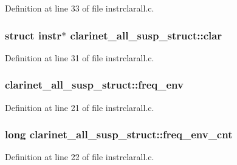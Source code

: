Definition at line 33 of file instrclarall.\+c.

\subsubsection[{\texorpdfstring{clar}{clar}}]{\setlength{\rightskip}{0pt plus 5cm}struct {\bf instr}$\ast$ clarinet\+\_\+all\+\_\+susp\+\_\+struct\+::clar}\hypertarget{structclarinet__all__susp__struct_a14a4f024e66a970d1ee9740505b037bf}{}\label{structclarinet__all__susp__struct_a14a4f024e66a970d1ee9740505b037bf}


Definition at line 31 of file instrclarall.\+c.

\subsubsection[{\texorpdfstring{freq\+\_\+env}{freq_env}}]{ clarinet\+\_\+all\+\_\+susp\+\_\+struct\+::freq\+\_\+env}\hypertarget{structclarinet__all__susp__struct_ad9db70d5a60b8409dc249aba845266e5}{}\label{structclarinet__all__susp__struct_ad9db70d5a60b8409dc249aba845266e5}


Definition at line 21 of file instrclarall.\+c.

\subsubsection[{\texorpdfstring{freq\+\_\+env\+\_\+cnt}{freq_env_cnt}}]{\setlength{\rightskip}{0pt plus 5cm}long clarinet\+\_\+all\+\_\+susp\+\_\+struct\+::freq\+\_\+env\+\_\+cnt}\hypertarget{structclarinet__all__susp__struct_afedb00ffb8cd5e8555422b9150ce8616}{}\label{structclarinet__all__susp__struct_afedb00ffb8cd5e8555422b9150ce8616}


Definition at line 22 of file instrclarall.\+c.

